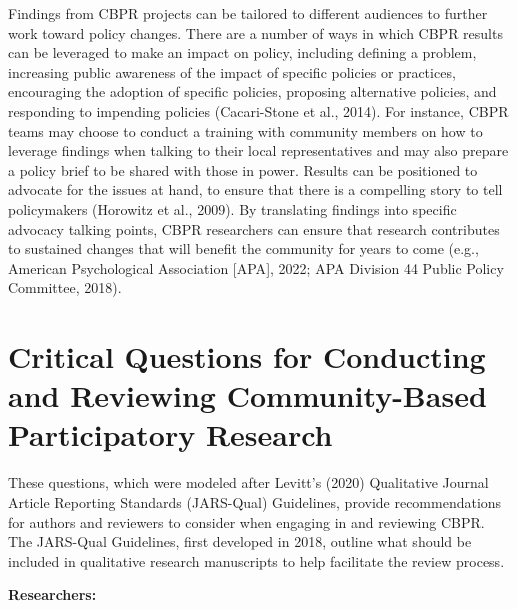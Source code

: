 \documentclass[
  11pt,
]{book}
\begin{document}
Findings from CBPR projects can be tailored to different audiences to further work toward policy changes. There are a number of ways in which CBPR results can be leveraged to make an impact on policy, including defining a problem, increasing public awareness of the impact of specific policies or practices, encouraging the adoption of specific policies, proposing alternative policies, and responding to impending policies (Cacari-Stone et al., 2014). For instance, CBPR teams may choose to conduct a training with community members on how to leverage findings when talking to their local representatives and may also prepare a policy brief to be shared with those in power. Results can be positioned to advocate for the issues at hand, to ensure that there is a compelling story to tell policymakers (Horowitz et al., 2009). By translating findings into specific advocacy talking points, CBPR researchers can ensure that research contributes to sustained changes that will benefit the community for years to come (e.g., American Psychological Association {[}APA{]}, 2022; APA Division 44 Public Policy Committee, 2018).

\section{Critical Questions for Conducting and Reviewing Community-Based Participatory Research}\label{critical-questions-for-conducting-and-reviewing-community-based-participatory-research}

These questions, which were modeled after Levitt's (2020) Qualitative Journal Article Reporting Standards (JARS-Qual) Guidelines, provide recommendations for authors and reviewers to consider when engaging in and reviewing CBPR. The JARS-Qual Guidelines, first developed in 2018, outline what should be included in qualitative research manuscripts to help facilitate the review process.

\textbf{Researchers:}
\end{document}
